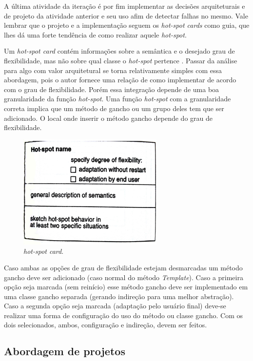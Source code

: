 A última atividade da iteração é por fim implementar as decisões arquiteturais e de projeto da atividade anterior e seu uso afim de detectar falhas no mesmo. Vale lembrar que o projeto e a implementação seguem os \textit{hot-spot cards} como guia, que lhes dá uma forte tendência de como realizar aquele \textit{hot-spot}.

Um \textit{hot-spot card} contém informações sobre a semântica e o desejado grau de flexibilidade, mas não sobre qual classe o \textit{hot-spot} pertence \cite{Fayad1999}. Passar da análise para algo com valor arquitetural se torna relativamente simples com essa abordagem, pois o autor fornece uma relação de como implementar de acordo com o grau de flexibilidade. Porém essa integração depende de uma boa granularidade da função \textit{hot-spot}. Uma função \textit{hot-spot} com a granularidade correta implica que um método de gancho ou um grupo deles tem que ser adicionado. O local onde inserir o método gancho depende do grau de flexibilidade.

\begin{figure}[h]
	\centering
	\label{fig16}
		\includegraphics[keepaspectratio=true,scale=0.4]{figuras/hotspotcard.jpg}
	\caption{\textit{hot-spot card}. \cite{Fayad1999}}
\end{figure}

Caso ambas as opções de grau de flexibilidade estejam desmarcadas um método gancho deve ser adicionado (caso normal do método \textit{Template}). Caso a primeira opção seja marcada (sem reinício) esse método gancho deve ser implementado em uma classe gancho separada (gerando indireção para uma melhor abstração). Caso a segunda opção seja marcada (adaptação pelo usuário final) deve-se realizar uma forma de configuração do uso do método ou classe gancho. Com os dois selecionados, ambos, configuração e indireção, devem ser feitos.

\subsection{Abordagem de projetos}

